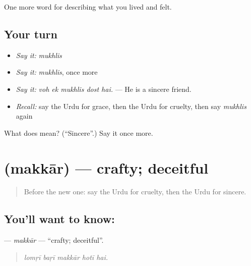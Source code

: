 \begin{grammarlens}[title={What you've built}]
One more word for describing what you lived and felt.
\end{grammarlens}

\subsection*{Your turn}
\begin{itemize}
\raggedright
  \item \emph{Say it:} \emph{mukhlis}
  \item \emph{Say it:} \emph{mukhlis}, once more
  \item \emph{Say it:} \emph{voh ek mukhlis dost hai.} — He is a sincere friend.
  \item \emph{Recall:} say the Urdu for grace, then the Urdu for cruelty, then say \emph{mukhlis} again
\end{itemize}

\begin{tcolorbox}[breakable,colback=teal!4,colframe=teal!35!black,title={Before you move on}]
What does  mean? (\textquotedblleft{}Sincere\textquotedblright{}.) Say it once more.
\end{tcolorbox}
\section[\texorpdfstring{\ur{مکار} (makkār)}{مکار (makkār)}]{ (makkār) — crafty; deceitful}

\label{lesson:UR-C457-makkar}



\begin{quote}
Before the new one: say the Urdu for cruelty, then the Urdu for sincere.
\end{quote}

\subsection*{You'll want to know: }
\textbf{} — \emph{makkār} — \textquotedblleft{}crafty; deceitful\textquotedblright{}.

\begin{quote}
    
\end{quote}

\begin{quote}
\emph{lomṛī baṛī makkār hotī hai.}
\end{quote}

